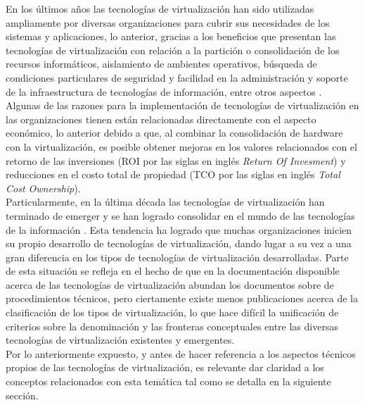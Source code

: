 En los últimos años las tecnologías de virtualización han sido utilizadas ampliamente por diversas organizaciones para cubrir sus necesidades de los sistemas y aplicaciones, lo anterior, gracias a los beneficios que presentan las tecnologías de virtualización con relación a la partición o consolidación de los recursos informáticos, aislamiento de ambientes operativos, búsqueda de condiciones particulares de seguridad y facilidad en la administración y soporte de la infraestructura de tecnologías de información, entre otros aspectos \parencite{Pessolani2012}.\\

Algunas de las razones para la implementación de tecnologías de virtualización en las organizaciones tienen están relacionadas directamente con el aspecto económico, lo anterior debido a que, al combinar la consolidación de hardware con la virtualización, es posible obtener mejoras en los valores relacionados con el retorno de las inversiones (ROI por las siglas en inglés \textit{Return Of Invesment}) y reducciones en el costo total de propiedad (TCO por las siglas en inglés \textit{Total Cost Ownership}).\\

Particularmente, en la última década las tecnologías de virtualización han terminado de emerger y se han logrado consolidar en el mundo de las tecnologías de la información \parencite{Kampert2010}. Esta tendencia ha logrado que muchas organizaciones inicien su propio desarrollo de tecnologías de virtualización, dando lugar a su vez a una gran diferencia en los tipos de tecnologías de virtualización desarrolladas. Parte de esta situación se refleja en el hecho de que en la documentación disponible acerca de las tecnologías de virtualización abundan los documentos sobre de procedimientos técnicos, pero ciertamente existe menos publicaciones acerca de la clasificación de los tipos de virtualización, lo que hace difícil la unificación de criterios sobre la denominación y las fronteras conceptuales entre las diversas tecnologías de virtualización existentes y emergentes. \\

Por lo anteriormente expuesto, y antes de hacer referencia a los aspectos técnicos propios de las tecnologías de virtualización, es relevante dar claridad a los conceptos relacionados con esta temática tal como se detalla en la siguiente sección. \\
